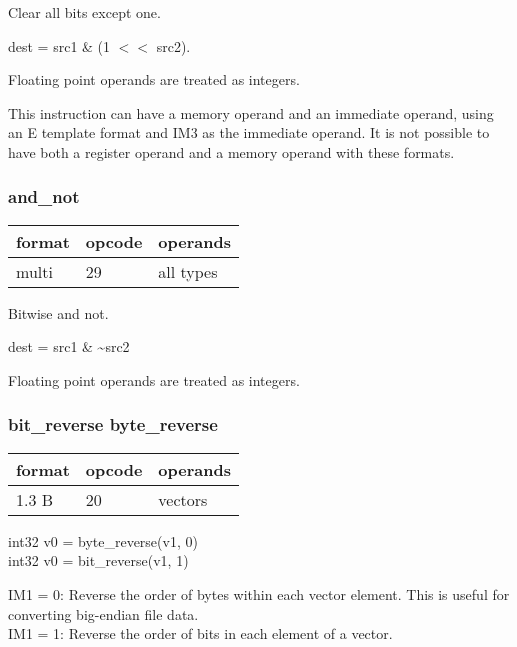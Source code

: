 \documentclass[forwardcom.tex]{subfiles}
\begin{document}
Clear all bits except one. 
\vspace{2mm}

dest = src1 \& (1 $<<$ src2).

\vspace{2mm}
Floating point operands are treated as integers.

\vspace{2mm}
This instruction can have a memory operand and an immediate operand, using an E template format and IM3  as the immediate operand. It is not possible to have both a register operand and a memory operand with these formats.
\vspace{2mm}

\subsubsection{and\_not}
\label{table:andNotInstruction}
\begin{tabular}{|p{12mm}|p{12mm}|p{110mm}|}
\hline
\bfseries format & \bfseries opcode & \bfseries operands \\ \hline
multi & 29 & all types \\ \hline
\end{tabular}
\vspace{2mm}

Bitwise and not.

dest = src1 \& \~{}src2
\vspace{2mm}

Floating point operands are treated as integers.

\subsubsection{bit\_reverse byte\_reverse}
\label{table:bitReverseInstruction}
\begin{tabular}{|p{12mm}|p{12mm}|p{110mm}|}
\hline
\bfseries format & \bfseries opcode & \bfseries operands \\ \hline
1.3 B & 20 & vectors \\ \hline
\end{tabular}
\vspace{2mm}

int32 v0 = byte\_reverse(v1, 0)\\
int32 v0 = bit\_reverse(v1, 1)
\vspace{2mm}

IM1 = 0: Reverse the order of bytes within each vector element. This is useful for converting big-endian file data.\\
IM1 = 1: Reverse the order of bits in each element of a vector.
\vspace{2mm}
\end{document}
